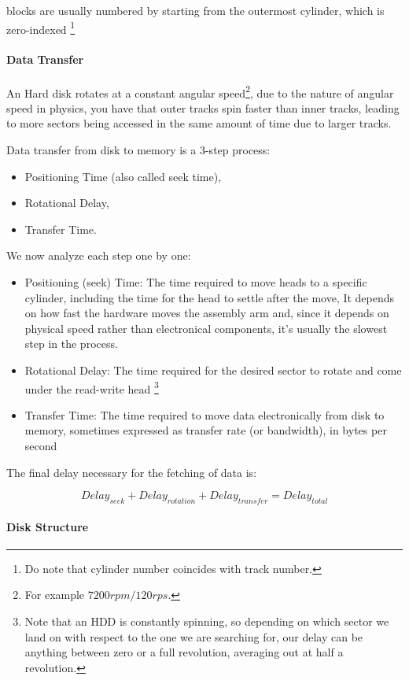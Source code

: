 \documentclass[openright, twoside]{report}
\theoremstyle{definition}
\theoremstyle{example}
\begin{document}
blocks are usually numbered by starting from the outermost cylinder, which is zero-indexed \footnote{Do note that cylinder number coincides with track number.}

\paragraph{Data Transfer}
An Hard disk rotates at a constant angular speed\footnote{For example $7200rpm/120rps$.}, due to the nature of angular speed in physics, you have that 
outer tracks spin faster than inner tracks, leading to more sectors being accessed in the same amount of time due to larger tracks.

Data transfer from disk to memory is a 3-step process:
\begin{itemize}
	\item Positioning Time (also called seek time),
	\item Rotational Delay,
	\item Transfer Time.
\end{itemize}

We now analyze each step one by one:

\begin{itemize}
	\item Positioning (seek) Time:
	The time required to move heads to a specific cylinder, including the time for the head to settle after the move,
	It depends on how fast the hardware moves the assembly arm and, since it depends on physical speed rather than electronical components, it's usually the 
	slowest step in the process.
	\item Rotational Delay:
	The time required for the desired sector to rotate and come under the read-write head \footnote{Note that an HDD is constantly spinning, so depending on which 
	sector we land on with respect to the one we are searching for, our delay can be anything between zero or a full revolution, averaging out at half a revolution.}\
	\item Transfer Time:
	The time required to move data electronically from disk to memory, sometimes expressed as transfer rate (or bandwidth), in bytes per second
\end{itemize}
The final delay necessary for the fetching of data is:

\[
	Delay_{seek} + Delay_{rotation} + Delay_{transfer} = Delay_{total}
	\]

\paragraph{Disk Structure}
\end{document}
